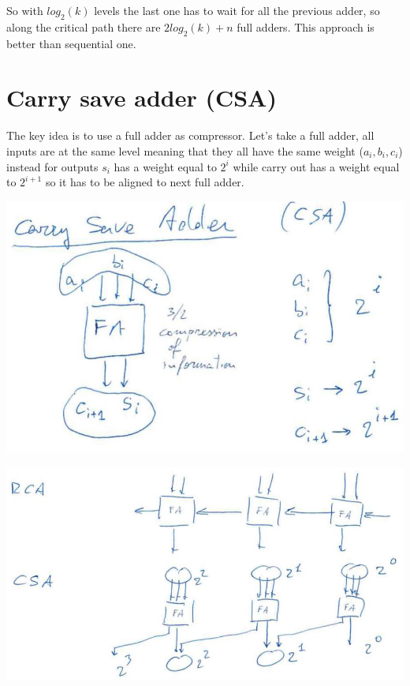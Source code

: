 So with $log_2( k)$ levels the last one has to wait for all the previous adder, so along the critical path there are $2log_2 (k)+n$ full adders. This approach is better than sequential one.


\section{Carry save adder (CSA)}

The key idea is to use a full adder as compressor. Let's take a full adder, all inputs are at the same level meaning that they all have the same weight ($a_i,b_i, c_i$) instead for outputs $s_i$ has a weight equal to $2^i$ while carry out has a weight equal to $2^{i+1}$ so it has to be aligned to next full adder.

\begin{center}
  \includegraphics[width=0.7\linewidth]{img/img2/26}
\end{center}
\begin{center}
  \includegraphics[width=0.7\linewidth]{img/img2/27}
\end{center}

